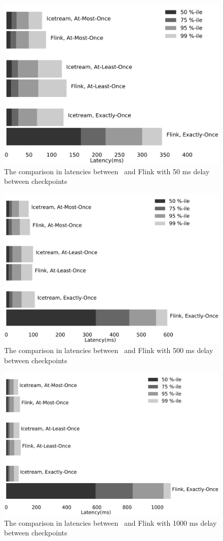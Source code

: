 \begin{figure}[htbp]
  \centering
  \includegraphics[width=.5\textwidth]{pics/comparison50}
  \caption{The comparison in latencies between \FlameStream\ and Flink with 50 ms delay between checkpoints}
  \label {comparison50}
\end{figure}

\begin{figure}[htbp]
  \centering
  \includegraphics[width=.5\textwidth]{pics/comparison500}
  \caption{The comparison in latencies between \FlameStream\ and Flink with 500 ms delay between checkpoints}
  \label {comparison500}
\end{figure}

\begin{figure}[htbp]
  \centering
  \includegraphics[width=.5\textwidth]{pics/comparison1000}
  \caption{The comparison in latencies between \FlameStream\ and Flink with 1000 ms delay between checkpoints}
  \label {comparison1000}
\end{figure}
